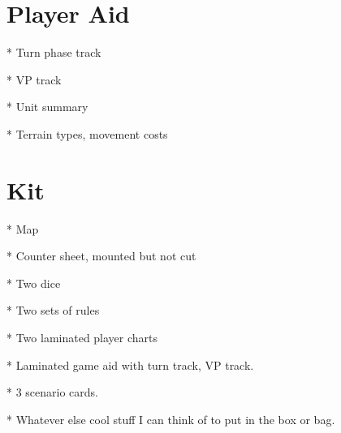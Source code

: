 \documentclass[10pt]{article}
\begin{document}
\section*{Player Aid}

* Turn phase track

* VP track

* Unit summary

* Terrain types, movement costs

\section*{Kit}

* Map

* Counter sheet, mounted but not cut

* Two dice

* Two sets of rules

* Two laminated player charts

* Laminated game aid with turn track, VP track.

* 3 scenario cards.

* Whatever else cool stuff I can think of to put in the box or bag.
\end{document}
